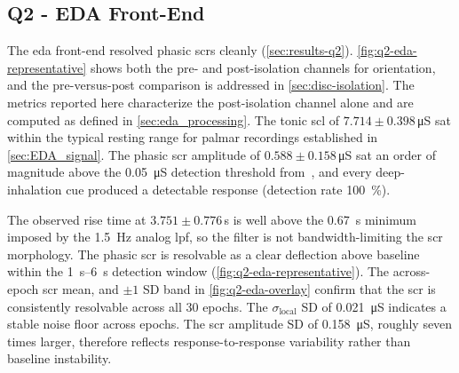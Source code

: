 \subsection{Q2 - EDA Front-End}
\label{sec:disc-q2}

The \gls{eda} front-end resolved phasic \glspl{scr} cleanly (\autoref{sec:results-q2}). \autoref{fig:q2-eda-representative} shows both the pre- and post-isolation channels for orientation, and the pre-versus-post comparison is addressed in \autoref{sec:disc-isolation}. The metrics reported here characterize the post-isolation channel alone and are computed as defined in \autoref{sec:eda_processing}. The tonic \gls{scl} of $\num{7.714} \pm \num{0.398}$\,\si{\micro\siemens} sat within the typical resting range for palmar recordings established in \autoref{sec:EDA_signal}. The phasic \gls{scr} amplitude of $\num{0.588} \pm \num{0.158}$\,\si{\micro\siemens} sat an order of magnitude above the \SI{0.05}{\micro\siemens} detection threshold from~\textcite{zangroniz_electrodermal_2017}, and every deep-inhalation cue produced a detectable response (detection rate \SI{100}{\percent}).

The observed rise time at $\num{3.751} \pm \num{0.776}$\,\si{\second} is well above the \SI{0.67}{\second} minimum imposed by the \SI{1.5}{\hertz} analog \gls{lpf}, so the filter is not bandwidth-limiting the \gls{scr} morphology. The phasic \gls{scr} is resolvable as a clear deflection above baseline within the \SIrange{1}{6}{\second} detection window (\autoref{fig:q2-eda-representative}). The across-epoch \gls{scr} mean, and $\pm 1$ SD band in \autoref{fig:q2-eda-overlay} confirm that the \gls{scr} is consistently resolvable across all 30 epochs. The $\sigma_{\text{local}}$ SD of \SI{0.021}{\micro\siemens} indicates a stable noise floor across epochs. The \gls{scr} amplitude SD of \SI{0.158}{\micro\siemens}, roughly seven times larger, therefore reflects response-to-response variability rather than baseline instability.

